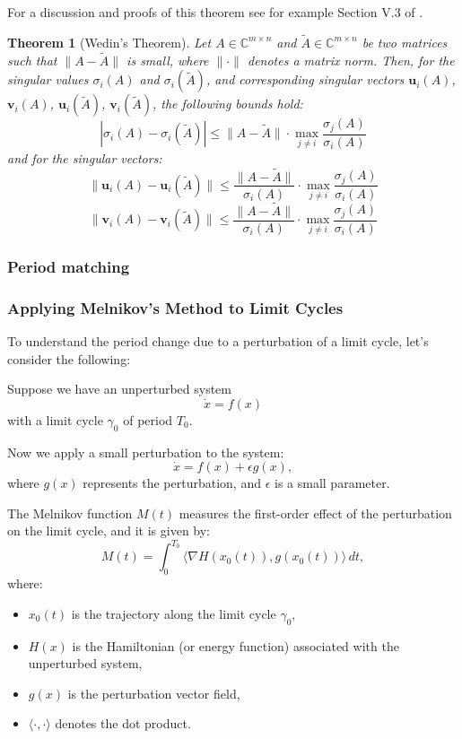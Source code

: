 \documentclass{article}
\newtheorem{theorem}{Theorem}
\theoremstyle{definition} \newtheorem{definition}{Definition}
\theoremstyle{remark} \newtheorem{remark}{Remark}
\newcounter{ct}
\begin{document}
For a discussion and proofs of this theorem see for example Section V.3 of \citet{stewart1990matrix}.


\begin{theorem}[Wedin's Theorem]
Let \( A \in \mathbb{C}^{m \times n} \) and \( \tilde{A} \in \mathbb{C}^{m \times n} \) be two matrices such that \( \| A - \tilde{A} \| \) is small, where \( \| \cdot \| \) denotes a matrix norm. Then, for the singular values \( \sigma_i(A) \) and \( \sigma_i(\tilde{A}) \), and corresponding singular vectors \( \mathbf{u}_i(A) \), \( \mathbf{v}_i(A) \), \( \mathbf{u}_i(\tilde{A}) \), \( \mathbf{v}_i(\tilde{A}) \), the following bounds hold:
\[
\left| \sigma_i(A) - \sigma_i(\tilde{A}) \right| \leq \| A - \tilde{A} \| \cdot \max_{j \neq i} \frac{\sigma_j(A)}{\sigma_i(A)}
\]
and for the singular vectors:
\[
\| \mathbf{u}_i(A) - \mathbf{u}_i(\tilde{A}) \| \leq \frac{\| A - \tilde{A} \|}{\sigma_i(A)} \cdot \max_{j \neq i} \frac{\sigma_j(A)}{\sigma_i(A)}
\]
\[
\| \mathbf{v}_i(A) - \mathbf{v}_i(\tilde{A}) \| \leq \frac{\| A - \tilde{A} \|}{\sigma_i(A)} \cdot \max_{j \neq i} \frac{\sigma_j(A)}{\sigma_i(A)}
\]
\end{theorem}



\subsubsection{Period matching}
\subsubsection{Applying Melnikov’s Method to Limit Cycles}

To understand the period change due to a perturbation of a limit cycle, let’s consider the following:

Suppose we have an unperturbed system
\[
\dot{x} = f(x)
\]
with a limit cycle \(\gamma_0\) of period \(T_0\).

Now we apply a small perturbation to the system:
\[
\dot{x} = f(x) + \epsilon g(x),
\]
where \(g(x)\) represents the perturbation, and \(\epsilon\) is a small parameter.

The Melnikov function \(M(t)\) measures the first-order effect of the perturbation on the limit cycle, and it is given by:
\[
M(t) = \int_0^{T_0} \langle \nabla H(x_0(t)), g(x_0(t)) \rangle \, dt,
\]
where:
\begin{itemize}
    \item \(x_0(t)\) is the trajectory along the limit cycle \(\gamma_0\),
    \item \(H(x)\) is the Hamiltonian (or energy function) associated with the unperturbed system,
    \item \(g(x)\) is the perturbation vector field,
    \item \(\langle \cdot, \cdot \rangle\) denotes the dot product.
\end{itemize}
\end{document}
